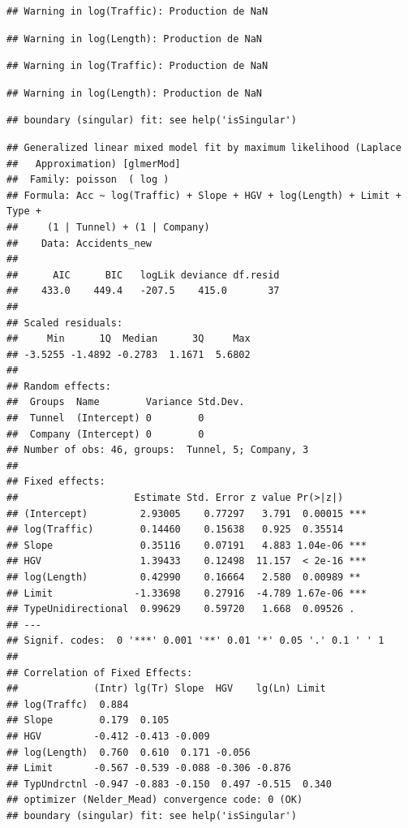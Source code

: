 \documentclass[
]{article}
\begin{document}
\begin{verbatim}
## Warning in log(Traffic): Production de NaN
\end{verbatim}

\begin{verbatim}
## Warning in log(Length): Production de NaN
\end{verbatim}

\begin{verbatim}
## Warning in log(Traffic): Production de NaN
\end{verbatim}

\begin{verbatim}
## Warning in log(Length): Production de NaN
\end{verbatim}

\begin{verbatim}
## boundary (singular) fit: see help('isSingular')
\end{verbatim}

\begin{verbatim}
## Generalized linear mixed model fit by maximum likelihood (Laplace
##   Approximation) [glmerMod]
##  Family: poisson  ( log )
## Formula: Acc ~ log(Traffic) + Slope + HGV + log(Length) + Limit + Type +  
##     (1 | Tunnel) + (1 | Company)
##    Data: Accidents_new
## 
##      AIC      BIC   logLik deviance df.resid 
##    433.0    449.4   -207.5    415.0       37 
## 
## Scaled residuals: 
##     Min      1Q  Median      3Q     Max 
## -3.5255 -1.4892 -0.2783  1.1671  5.6802 
## 
## Random effects:
##  Groups  Name        Variance Std.Dev.
##  Tunnel  (Intercept) 0        0       
##  Company (Intercept) 0        0       
## Number of obs: 46, groups:  Tunnel, 5; Company, 3
## 
## Fixed effects:
##                    Estimate Std. Error z value Pr(>|z|)    
## (Intercept)         2.93005    0.77297   3.791  0.00015 ***
## log(Traffic)        0.14460    0.15638   0.925  0.35514    
## Slope               0.35116    0.07191   4.883 1.04e-06 ***
## HGV                 1.39433    0.12498  11.157  < 2e-16 ***
## log(Length)         0.42990    0.16664   2.580  0.00989 ** 
## Limit              -1.33698    0.27916  -4.789 1.67e-06 ***
## TypeUnidirectional  0.99629    0.59720   1.668  0.09526 .  
## ---
## Signif. codes:  0 '***' 0.001 '**' 0.01 '*' 0.05 '.' 0.1 ' ' 1
## 
## Correlation of Fixed Effects:
##             (Intr) lg(Tr) Slope  HGV    lg(Ln) Limit 
## log(Traffc)  0.884                                   
## Slope        0.179  0.105                            
## HGV         -0.412 -0.413 -0.009                     
## log(Length)  0.760  0.610  0.171 -0.056              
## Limit       -0.567 -0.539 -0.088 -0.306 -0.876       
## TypUndrctnl -0.947 -0.883 -0.150  0.497 -0.515  0.340
## optimizer (Nelder_Mead) convergence code: 0 (OK)
## boundary (singular) fit: see help('isSingular')
\end{verbatim}
\end{document}
